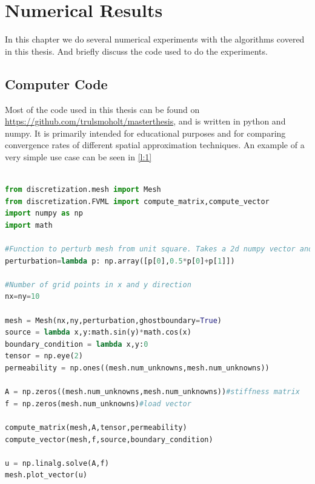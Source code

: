 \documentclass[../Main/main.tex]{subfiles}
\begin{document}
\graphicspath{{../numerical results/figs/}}
		\chapter{Numerical Results}
		In this chapter we do several numerical experiments with the algorithms covered in this thesis. And briefly discuss the code used to do the experiments.
		\section{Computer Code}
		Most of the code used in this thesis can be found on \href{https://github.com/trulsmoholt/masterthesis}{https://github.com/trulsmoholt/masterthesis}, and is written in python and numpy. It is primarily intended for educational purposes and for comparing convergence rates of different spatial approximation techniques. An example of a very simple use case can be seen in \ref{l:1} \\
		\begin{minipage}{\linewidth}
			\begin{lstlisting}[language=Python,caption=Solving simple Poisson equation.,label=l:1]

from discretization.mesh import Mesh
from discretization.FVML import compute_matrix,compute_vector
import numpy as np
import math

#Function to perturb mesh from unit square. Takes a 2d numpy vector and returns a 2d numpy vector. This particular choice makes a paralellogram mesh.
perturbation=lambda p: np.array([p[0],0.5*p[0]+p[1]])

#Number of grid points in x and y direction
nx=ny=10

mesh = Mesh(nx,ny,perturbation,ghostboundary=True)
source = lambda x,y:math.sin(y)*math.cos(x)
boundary_condition = lambda x,y:0
tensor = np.eye(2)
permeability = np.ones((mesh.num_unknowns,mesh.num_unknowns))

A = np.zeros((mesh.num_unknowns,mesh.num_unknowns))#stiffness matrix
f = np.zeros(mesh.num_unknowns)#load vector

compute_matrix(mesh,A,tensor,permeability)
compute_vector(mesh,f,source,boundary_condition)

u = np.linalg.solve(A,f)
mesh.plot_vector(u)
			\end{lstlisting}
		\end{minipage}
		
\end{document}

